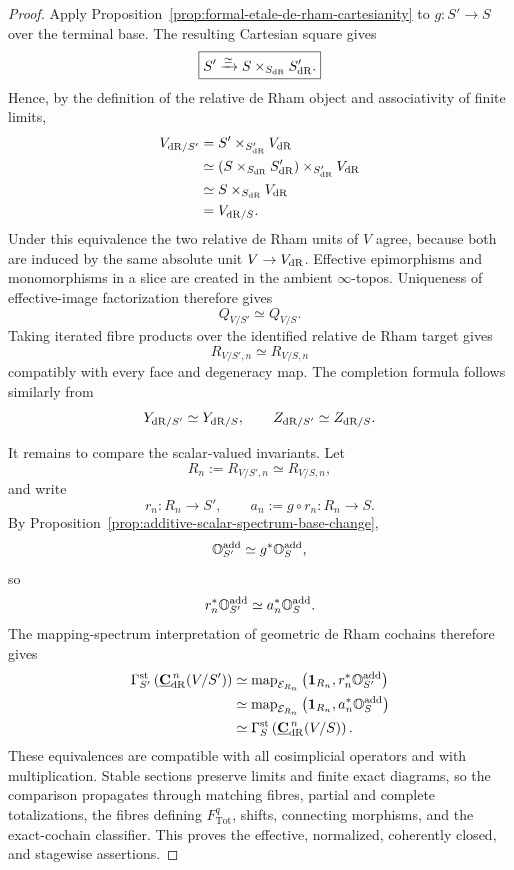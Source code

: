 \begin{proof}
Apply Proposition~\ref{prop:formal-etale-de-rham-cartesianity} to
\(g:S'\to S\) over the terminal base.  The resulting Cartesian square gives
\[
\boxed{
    S'
    \xrightarrow{\simeq}
    S\times_{S_{\mathrm{dR}}}S'_{\mathrm{dR}}.
}
\]
Hence, by the definition of the relative de Rham object and associativity of
finite limits,
\[
\begin{aligned}
    V_{\mathrm{dR}/S'}
    &=
    S'\times_{S'_{\mathrm{dR}}}V_{\mathrm{dR}}
    \\
    &\simeq
    \left(
        S\times_{S_{\mathrm{dR}}}S'_{\mathrm{dR}}
    \right)
    \times_{S'_{\mathrm{dR}}}V_{\mathrm{dR}}
    \\
    &\simeq
    S\times_{S_{\mathrm{dR}}}V_{\mathrm{dR}}
    \\
    &=
    V_{\mathrm{dR}/S}.
\end{aligned}
\]
Under this equivalence the two relative de Rham units of \(V\) agree, because
both are induced by the same absolute unit \(V\to V_{\mathrm{dR}}\).  Effective
epimorphisms and monomorphisms in a slice are created in the ambient
\(\infty\)-topos.  Uniqueness of effective-image factorization therefore gives
\[
    Q_{V/S'}\simeq Q_{V/S}.
\]
Taking iterated fibre products over the identified relative de Rham target
gives
\[
    R_{V/S',n}\simeq R_{V/S,n}
\]
compatibly with every face and degeneracy map.  The completion formula follows
similarly from
\[
    Y_{\mathrm{dR}/S'}\simeq Y_{\mathrm{dR}/S},
    \qquad
    Z_{\mathrm{dR}/S'}\simeq Z_{\mathrm{dR}/S}.
\]

It remains to compare the scalar-valued invariants.  Let
\[
    R_n:=R_{V/S',n}\simeq R_{V/S,n},
\]
and write
\[
    r_n:R_n\to S',
    \qquad
    a_n:=g\circ r_n:R_n\to S.
\]
By Proposition~\ref{prop:additive-scalar-spectrum-base-change},
\[
    \mathbb O_{S'}^{\mathrm{add}}
    \simeq
    g^*\mathbb O_S^{\mathrm{add}},
\]
so
\[
    r_n^*\mathbb O_{S'}^{\mathrm{add}}
    \simeq
    a_n^*\mathbb O_S^{\mathrm{add}}.
\]
The mapping-spectrum interpretation of geometric de Rham cochains therefore
gives
\[
\begin{aligned}
    \Gamma_{S'}^{\mathrm{st}}
    \left(
        \underline{\mathbf C}_{\mathrm{dR}}^{\,n}(V/S')
    \right)
    &\simeq
    \operatorname{map}_{\mathcal E_{R_n}}
    \left(
        \mathbf1_{R_n},
        r_n^*\mathbb O_{S'}^{\mathrm{add}}
    \right)
    \\
    &\simeq
    \operatorname{map}_{\mathcal E_{R_n}}
    \left(
        \mathbf1_{R_n},
        a_n^*\mathbb O_S^{\mathrm{add}}
    \right)
    \\
    &\simeq
    \Gamma_S^{\mathrm{st}}
    \left(
        \underline{\mathbf C}_{\mathrm{dR}}^{\,n}(V/S)
    \right).
\end{aligned}
\]
These equivalences are compatible with all cosimplicial operators and with
multiplication.  Stable sections preserve limits and finite exact diagrams,
so the comparison propagates through matching fibres, partial and complete
totalizations, the fibres defining \(F_{\mathrm{Tot}}^q\), shifts, connecting
morphisms, and the exact-cochain classifier.  This proves the effective,
normalized, coherently closed, and stagewise assertions.


\end{proof}
